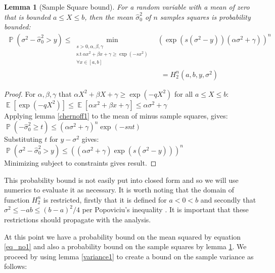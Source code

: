 \documentclass[aap,preprint]{imsart}
\newtheorem{lemma}{Lemma}
\DeclareMathOperator{\E}{\mathbb{E}}
\DeclareMathOperator{\p}{\mathbb{P}}
\begin{document}
\begin{lemma}[Sample Square bound]\label{sample_squares}
For a random variable with a mean of zero that is bounded $a\le X\le b$, then the mean $\hat{\sigma}_0^2$ of $n$ samples squares is probability bounded:
\begin{align*} \p(\sigma^2 - \hat{\sigma}_0^2> y) \le \min_{\substack{s>0,\alpha,\beta,\gamma \\ \text{s.t}~\alpha x^2 + \beta x + \gamma\ge\exp(-sx^2)\\ \forall x\in[a,b]}} &\left(\exp(s(\sigma^2-y))(\alpha\sigma^2 + \gamma)\right)^n \\& ~~= H_2^n(a,b,y,\sigma^2)
\end{align*}
\end{lemma}
\begin{proof}
For $\alpha,\beta,\gamma$ that $\alpha X^2 + \beta X + \gamma \ge \exp(-qX^2)$ for all $a\le X\le b$:\\
$ \E[\exp(-qX^2)] \le \E[\alpha x^2 +\beta x +\gamma] \le \alpha\sigma^2 + \gamma $\\
Applying lemma \ref{chernoff1} to the mean of minus sample squares, gives:\\
$\p(-\hat{\sigma}_0^2\ge t) \le (\alpha\sigma^2 + \gamma)^n\exp(-snt) $\\
Substituting $t$ for $y-\sigma^2$ gives:\\
$\p(\sigma^2 - \hat{\sigma}_0^2> y) \le ((\alpha\sigma^2 + \gamma)\exp(s(\sigma^2-y)))^n $\\
Minimizing subject to constraints gives result.
\end{proof}

This probability bound is not easily put into closed form and so we will use numerics to evaluate it as necessary.
It is worth noting that the domain of function $H_2^n$ is restricted, firstly that it is defined for $a<0<b$ and secondly that $\sigma^2\le-ab\le (b-a)^2/4$ per Popoviciu's inequality \cite{zbMATH05780164}. It is important that these restrictions should propagate with the analysis.

At this point we have a probability bound on the mean squared by equation \ref{eq_no1} and also a probability bound on the sample squares by lemma \ref{sample_squares}. We proceed by using lemma \ref{variance1} to create a bound on the sample variance as follows:
\end{document}
